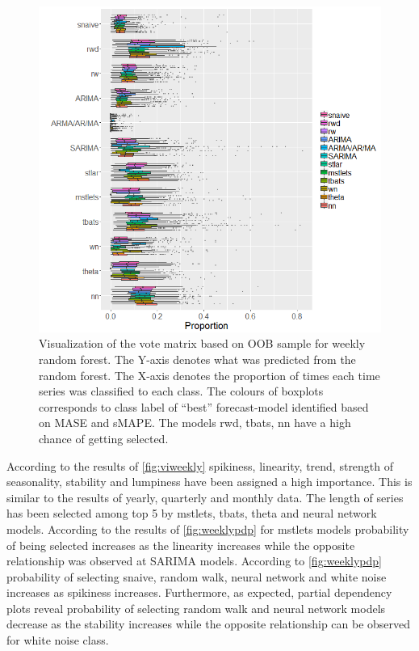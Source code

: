 \documentclass[11pt,a4paper,]{article}
\begin{document}
\begin{figure}
\centering
\includegraphics{figures/oobweekly-1.png}
\caption{\label{fig:oobweekly}Visualization of the vote matrix based on OOB
sample for weekly random forest. The Y-axis denotes what was predicted
from the random forest. The X-axis denotes the proportion of times each
time series was classified to each class. The colours of boxplots
corresponds to class label of ``best'' forecast-model identified based
on MASE and sMAPE. The models rwd, tbats, nn have a high chance of
getting selected.}
\end{figure}

\clearpage

According to the results of \autoref{fig:viweekly} spikiness, linearity,
trend, strength of seasonality, stability and lumpiness have been
assigned a high importance. This is similar to the results of yearly,
quarterly and monthly data. The length of series has been selected among
top 5 by mstlets, tbats, theta and neural network models. According to
the results of \autoref{fig:weeklypdp} for mstlets models probability of
being selected increases as the linearity increases while the opposite
relationship was observed at SARIMA models. According to
\autoref{fig:weeklypdp} probability of selecting snaive, random walk,
neural network and white noise increases as spikiness increases.
Furthermore, as expected, partial dependency plots reveal probability of
selecting random walk and neural network models decrease as the
stability increases while the opposite relationship can be observed for
white noise class.
\end{document}
